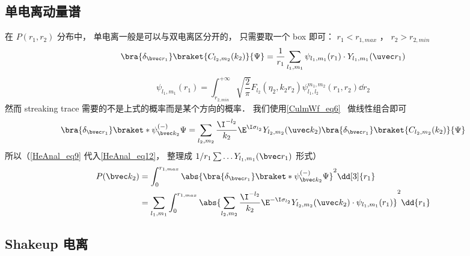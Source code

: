 \subsection{单电离动量谱}
在 $P(r_1, r_2)$ 分布中， 单电离一般是可以与双电离区分开的， 只需要取一个 box 即可： $r_1 < r_{1,max}$ ， $r_2 > r_{2,min}$
\begin{equation}\label{HeAnal_eq9}
\bra{\delta_{\bvec r_1}}\braket{C_{l_2,m_2}(k_2)}{\Psi} = \frac{1}{r_1} \sum_{l_1, m_1} \psi_{l_1,m_1}(r_1) \cdot Y_{l_1, m_1}(\uvec r_1)
\end{equation}
\begin{equation}
\psi_{l_1,m_1}(r_1) = \int_{r_{2,min}}^{+\infty} \sqrt{\frac{2}{\pi}}F_{l_2}(\eta_2, k_2 r_2)\psi_{l_1, l_2}^{m_1, m_2}(r_1, r_2)\dd{r_2}
\end{equation}
然而 streaking trace 需要的不是上式的概率而是某个方向的概率． 我们使用\autoref{CulmWf_eq6}~ 做线性组合即可
\begin{equation}\label{HeAnal_eq12}
\bra{\delta_{\bvec r_1}}\braket*{\psi_{\bvec k_2}^{(-)}}{\Psi} = \sum_{l_2,m_2} \frac{\I^{-l_2}}{k_2} \E^{\I\sigma_{l_2}}Y_{l_2,m_2}(\uvec k_2) \bra{\delta_{\bvec r_1}}\braket{C_{l_2,m_2}(k_2)}{\Psi}
\end{equation}
所以（\autoref{HeAnal_eq9} 代入\autoref{HeAnal_eq12}， 整理成 $1/r_1\sum \dots Y_{l_1,m_1}(\bvec r_1)$ 形式）
\begin{equation}\label{HeAnal_eq11}
\begin{aligned}
P(\bvec k_2) &= \int_0^{r_{1,max}} \abs{\bra{\delta_{\bvec r_1}}\braket*{\psi_{\bvec k_2}^{(-)}}{\Psi}}^2 \dd[3]{r_1}\\
&= \sum_{l_1,m_1} \int_0^{r_{1,max}} \abs{\sum_{l_2,m_2} \frac{\I^{-l_2}}{k_2} \E^{-\I \sigma_{l_2}} Y_{l_2,m_2}(\uvec k_2) \cdot \psi_{l_1,m_1}(r_1)}^2 \dd{r_1}
\end{aligned}
\end{equation}

\subsection{Shakeup 电离}

